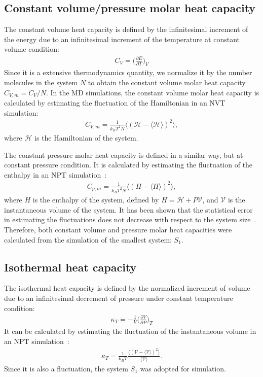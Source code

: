 \documentclass[a4paper,preprint,unsortedaddress,onecolumn,fleqn]{revtex4}
\newcommand{\systemsb}{S_1}
\begin{document}
\subsection{Constant volume/pressure molar heat capacity}

The constant volume heat capacity is defined by the infinitesimal increment
of the energy due to an infinitesimal increment of the temperature at
constant volume condition: 
\begin{align}
C_V = \Big(\frac{\partial E}{\partial T}\Big)_V
\end{align}
Since it is a extensive thermodynamics quantity, we normalize it by the
number molecules in the system $N$ to obtain the constant volume molar heat
capacity $C_{V,m} = C_V/N$. In the MD simulations, the constant volume molar
heat capacity is calculated by estimating the fluctuation of the Hamiltonian
in an NVT simulation: 
\begin{align}
C_{V,m} = \frac{1}{k_BT^2 N} \langle (\mathcal{H }- \langle\mathcal{H}%
\rangle)^2 \rangle,
\end{align}
where $\mathcal{H}$ is the Hamiltonian of the system. 

The constant pressure molar heat capacity is defined in a similar way, but
at constant pressure condition. It is calculated by estimating the
fluctuation of the enthalpy in an NPT simulation~\cite{wang2011existence}: 
\begin{align}
C_{p,m} = \frac{1}{k_BT^2 N} \langle ( H - \langle H\rangle)^2 \rangle,
\end{align}
where $H$ is the enthalpy of the system, defined by $H = \mathcal{H }+ P%
\mathcal{V}$, and $\mathcal{V}$ is the instantaneous volume of the system.
It has been shown that the statistical error in estimating the fluctuations
does not decrease with respect to the system size~\cite%
{milchev1986fluctuations,ferrenberg1991statistical}. Therefore, both
constant volume and pressure molar heat capacities were calculated from the
simulation of the smallest system: $S_1$.

\subsection{Isothermal heat capacity}

The isothermal heat capacity is defined by the normalized increment of
volume due to an infinitesimal decrement of pressure under constant
temperature condition: 
\begin{align}
\kappa_T = - \frac 1V \Big(\frac{\partial V}{\partial P}\Big)_T
\end{align}
It can be calculated by estimating the fluctuation of the instantaneous
volume in an NPT simulation~\cite{wang2011existence}: 
\begin{align}
\kappa_T = \frac{1}{k_BT} \frac{\langle (\mathcal{V }- \langle \mathcal{V}%
\rangle)^2 \rangle}{\langle \mathcal{V}\rangle}.
\end{align}
Since it is also a fluctuation, the system $S_1$ was adopted for simulation.
\end{document}
